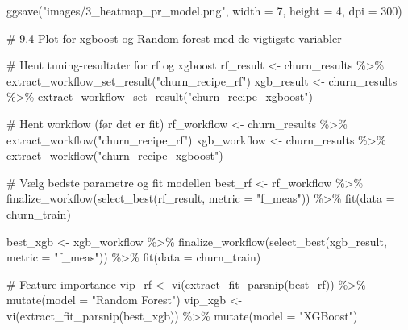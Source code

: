 \documentclass[
  11pt,
  letterpaper,
  DIV=11,
  numbers=noendperiod]{scrartcl}
\newenvironment{Shaded}{\begin{snugshade}}{\end{snugshade}}
\newcommand{\AttributeTok}[1]{\textcolor[rgb]{0.40,0.45,0.13}{#1}}
\newcommand{\CommentTok}[1]{\textcolor[rgb]{0.37,0.37,0.37}{#1}}
\newcommand{\DecValTok}[1]{\textcolor[rgb]{0.68,0.00,0.00}{#1}}
\newcommand{\FunctionTok}[1]{\textcolor[rgb]{0.28,0.35,0.67}{#1}}
\newcommand{\NormalTok}[1]{\textcolor[rgb]{0.00,0.23,0.31}{#1}}
\newcommand{\OtherTok}[1]{\textcolor[rgb]{0.00,0.23,0.31}{#1}}
\newcommand{\SpecialCharTok}[1]{\textcolor[rgb]{0.37,0.37,0.37}{#1}}
\newcommand{\StringTok}[1]{\textcolor[rgb]{0.13,0.47,0.30}{#1}}
\begin{document}
\begin{Shaded}
\begin{Highlighting}[]
\FunctionTok{ggsave}\NormalTok{(}\StringTok{"images/3\_heatmap\_pr\_model.png"}\NormalTok{, }\AttributeTok{width =} \DecValTok{7}\NormalTok{, }\AttributeTok{height =} \DecValTok{4}\NormalTok{, }\AttributeTok{dpi =} \DecValTok{300}\NormalTok{)}


\CommentTok{\# 9.4 Plot for xgboost og Random forest med de vigtigste variabler }


\CommentTok{\# Hent tuning{-}resultater for rf og xgboost}
\NormalTok{rf\_result }\OtherTok{\textless{}{-}}\NormalTok{ churn\_results }\SpecialCharTok{\%\textgreater{}\%} \FunctionTok{extract\_workflow\_set\_result}\NormalTok{(}\StringTok{"churn\_recipe\_rf"}\NormalTok{)}
\NormalTok{xgb\_result }\OtherTok{\textless{}{-}}\NormalTok{ churn\_results }\SpecialCharTok{\%\textgreater{}\%} \FunctionTok{extract\_workflow\_set\_result}\NormalTok{(}\StringTok{"churn\_recipe\_xgboost"}\NormalTok{)}

\CommentTok{\# Hent workflow (før det er fit)}
\NormalTok{rf\_workflow }\OtherTok{\textless{}{-}}\NormalTok{ churn\_results }\SpecialCharTok{\%\textgreater{}\%} \FunctionTok{extract\_workflow}\NormalTok{(}\StringTok{"churn\_recipe\_rf"}\NormalTok{)}
\NormalTok{xgb\_workflow }\OtherTok{\textless{}{-}}\NormalTok{ churn\_results }\SpecialCharTok{\%\textgreater{}\%} \FunctionTok{extract\_workflow}\NormalTok{(}\StringTok{"churn\_recipe\_xgboost"}\NormalTok{)}

\CommentTok{\# Vælg bedste parametre og fit modellen}
\NormalTok{best\_rf }\OtherTok{\textless{}{-}}\NormalTok{ rf\_workflow }\SpecialCharTok{\%\textgreater{}\%}
  \FunctionTok{finalize\_workflow}\NormalTok{(}\FunctionTok{select\_best}\NormalTok{(rf\_result, }\AttributeTok{metric =} \StringTok{"f\_meas"}\NormalTok{)) }\SpecialCharTok{\%\textgreater{}\%}
  \FunctionTok{fit}\NormalTok{(}\AttributeTok{data =}\NormalTok{ churn\_train)}

\NormalTok{best\_xgb }\OtherTok{\textless{}{-}}\NormalTok{ xgb\_workflow }\SpecialCharTok{\%\textgreater{}\%}
  \FunctionTok{finalize\_workflow}\NormalTok{(}\FunctionTok{select\_best}\NormalTok{(xgb\_result, }\AttributeTok{metric =} \StringTok{"f\_meas"}\NormalTok{)) }\SpecialCharTok{\%\textgreater{}\%}
  \FunctionTok{fit}\NormalTok{(}\AttributeTok{data =}\NormalTok{ churn\_train)}

\CommentTok{\# Feature importance}
\NormalTok{vip\_rf }\OtherTok{\textless{}{-}} \FunctionTok{vi}\NormalTok{(}\FunctionTok{extract\_fit\_parsnip}\NormalTok{(best\_rf)) }\SpecialCharTok{\%\textgreater{}\%} \FunctionTok{mutate}\NormalTok{(}\AttributeTok{model =} \StringTok{"Random Forest"}\NormalTok{)}
\NormalTok{vip\_xgb }\OtherTok{\textless{}{-}} \FunctionTok{vi}\NormalTok{(}\FunctionTok{extract\_fit\_parsnip}\NormalTok{(best\_xgb)) }\SpecialCharTok{\%\textgreater{}\%} \FunctionTok{mutate}\NormalTok{(}\AttributeTok{model =} \StringTok{"XGBoost"}\NormalTok{)}


\end{Highlighting}
\end{Shaded}
\end{document}
